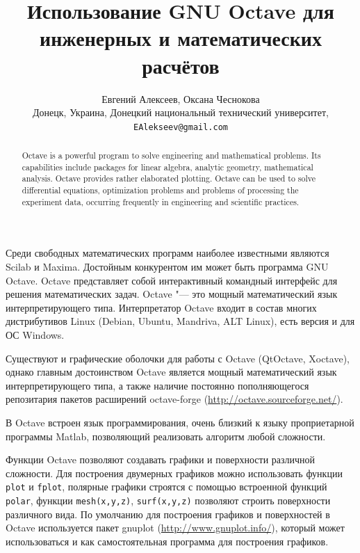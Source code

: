\documentclass[10pt, a5paper]{article}
\begin{document}
\title{Использование GNU Octave для инженерных и математических расчётов}

\author{Евгений Алексеев, Оксана Чеснокова\\
\small Донецк, Украина, Донецкий национальный технический университет,\\ 
\small \texttt{EAlekseev@gmail.com}
}
\maketitle

\begin{abstract}
Octave is a powerful program to solve engineering and mathematical problems. Its capabilities include packages for linear algebra, analytic geometry, mathematical analysis. Octave provides rather elaborated plotting. Octave can be used to solve differential equations, optimization problems and problems of processing the experiment data, occurring frequently in engineering and scientific practices.
\end{abstract}

Среди свободных математических программ наиболее известными являются Scilab и Maxima. Достойным конкурентом им может быть программа GNU Octave. Octave представляет собой  интерактивный командный интерфейс для решения математических задач. Octave "--- это мощный математический язык  интерпретирующего типа. Интерпретатор Octave входит в состав многих дистрибутивов Linux (Debian, Ubuntu, Mandriva, ALT Linux), есть версия и для ОС Windows.

Существуют и графические оболочки для работы с Octave (QtOctave, Xoctave), однако главным достоинством Octave является мощный математический язык интерпретирующего типа, а также наличие постоянно пополняющегося репозитария пакетов расширений octave-forge (\url{http://octave.sourceforge.net/}).

В Octave встроен язык программирования, очень близкий к языку проприетарной программы Matlab, позволяющий  реализовать алгоритм любой сложности.

Функции Octave позволяют создавать графики и поверхности различной сложности. Для построения двумерных графиков можно использовать функции \verb!plot! и \verb!fplot!, полярные графики строятся с помощью встроенной функций \verb!polar!, функции \verb!mesh(x,y,z)!, \verb!surf(x,y,z)! позволяют строить поверхности различного вида. По умолчанию для построения графиков и поверхностей в Octave используется пакет gnuplot (\url{http://www.gnuplot.info/}), который может использоваться и как самостоятельная программа для построения графиков.
\end{document}
